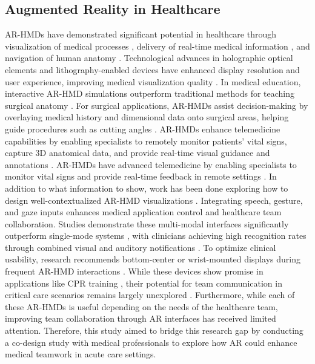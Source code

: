 \subsection{Augmented Reality in Healthcare}

AR-HMDs have demonstrated significant potential in healthcare through visualization of medical processes \cite{huang2018use}, delivery of real-time medical information \cite{wang2015real, jayaprakash2019asthma}, and navigation of human anatomy \cite{lungu2021review}. Technological advances in holographic optical elements and lithography-enabled devices have enhanced display resolution and user experience, improving medical visualization quality \cite{xiong2021augmented}. In medical education, interactive AR-HMD simulations outperform traditional methods for teaching surgical anatomy \cite{siff2018interactive, lungu2021review}. For surgical applications, AR-HMDs assist decision-making by overlaying medical history and dimensional data onto surgical areas, helping guide procedures such as cutting angles \cite{pokhrel2019novel}. AR-HMDs enhance telemedicine capabilities by enabling specialists to remotely monitor patients' vital signs, capture 3D anatomical data, and provide real-time visual guidance and annotations \cite{anton2017augmented, wang2021ar}. AR-HMDs have advanced telemedicine by enabling specialists to monitor vital signs and provide real-time feedback in remote settings \cite{wang2021ar, anton2017augmented}. In addition to what information to show, work has been done exploring how to design well-contextualized AR-HMD visualizations \cite{PlabstVisualisation2021}. Integrating speech, gesture, and gaze inputs \cite{liao2022realitytalk, muller2023tictactoes} enhances medical application control and healthcare team collaboration. Studies demonstrate these multi-modal interfaces significantly outperform single-mode systems \cite{wang2021interaction}, with clinicians achieving high recognition rates through combined visual and auditory notifications \cite{lazaro2021interaction}. To optimize clinical usability, research recommends bottom-center or wrist-mounted displays during frequent AR-HMD interactions \cite{plabst2022push}. While these devices show promise in applications like CPR training \cite{semeraro2013motion, almousa2019virtual, balian2019feasibility, siebert2017adherence}, their potential for team communication in critical care scenarios remains largely unexplored \cite{gower2022utilizing}. Furthermore, while each of these AR-HMDs is useful depending on the needs of the healthcare team, improving team collaboration through AR interfaces has received limited attention. Therefore, this study aimed to bridge this research gap by conducting a co-design study with medical professionals to explore how AR could enhance medical teamwork in acute care settings. 

